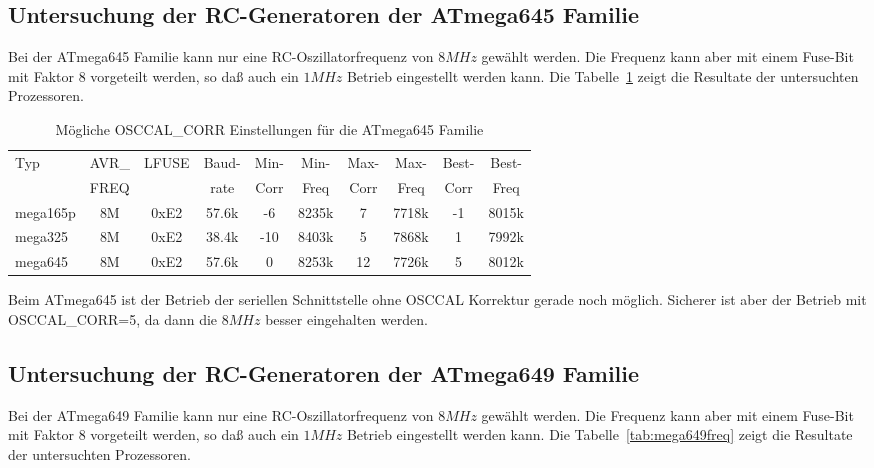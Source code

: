\subsection{Untersuchung der RC-Generatoren der ATmega645 Familie}

Bei der ATmega645 Familie kann nur eine RC-Oszillatorfrequenz von \(8MHz\) gewählt werden. Die Frequenz kann
aber mit einem Fuse-Bit mit Faktor 8 vorgeteilt werden, so daß auch ein \(1MHz\) Betrieb eingestellt
werden kann. Die Tabelle~\ref{tab:mega645freq} zeigt die Resultate der untersuchten Prozessoren.

\begin{table}[H]
  \begin{center}
    \begin{tabular}{| l | c | c | c || c | c || c | c || c | c |}
    \hline
   Typ  &       AVR\_ & LFUSE & Baud- & Min- & Min- & Max- & Max- & Best- & Best-  \\
        &       FREQ  &       & rate & Corr & Freq & Corr & Freq  & Corr  & Freq  \\
    \hline
    \hline
mega165p &         8M & 0xE2  & 57.6k & -6  & 8235k &  7  & 7718k  & -1  & 8015k \\
    \hline
mega325  &         8M & 0xE2  & 38.4k & -10 & 8403k &  5  & 7868k  &  1  & 7992k \\
    \hline
mega645 &          8M & 0xE2  & 57.6k &  0  & 8253k & 12  & 7726k  & 5  & 8012k \\
    \hline
    \end{tabular}
  \end{center}
  \caption{Mögliche OSCCAL\_CORR Einstellungen für die ATmega645 Familie}
  \label{tab:mega645freq}
\end{table}

Beim ATmega645 ist der Betrieb der seriellen Schnittstelle ohne OSCCAL Korrektur gerade noch möglich.
Sicherer ist aber der Betrieb mit OSCCAL\_CORR=5, da dann die \(8MHz\) besser eingehalten werden. 

\subsection{Untersuchung der RC-Generatoren der ATmega649 Familie}

Bei der ATmega649 Familie kann nur eine RC-Oszillatorfrequenz von \(8MHz\) gewählt werden. Die Frequenz kann
aber mit einem Fuse-Bit mit Faktor 8 vorgeteilt werden, so daß auch ein \(1MHz\) Betrieb eingestellt
werden kann. Die Tabelle~\ref{tab:mega649freq} zeigt die Resultate der untersuchten Prozessoren.

